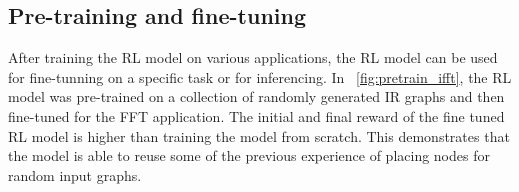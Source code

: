\subsection{Pre-training and fine-tuning}
After training the RL model on various applications, the RL model can be used for fine-tunning on a specific task or for inferencing.
In \figurename~\ref{fig:pretrain_ifft}, the RL model was pre-trained on a collection of randomly generated IR graphs and then fine-tuned for the FFT application.
The initial and final reward of the fine tuned RL model is higher than training the model from scratch.
This demonstrates that the model is able to reuse some of the previous experience of placing nodes for random input graphs.